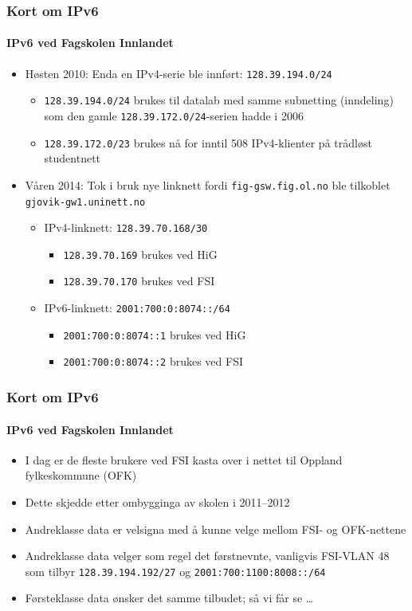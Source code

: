 \begin{frame}%
  \frametitle{Kort om IPv6}
  \framesubtitle{IPv6 ved Fagskolen Innlandet}
  \begin{itemize}[<+->]
  \item Høsten 2010: Enda en IPv4-serie ble innført:
    \texttt{128.39.194.0/24}
    \begin{itemize}[<+->]
    \item \texttt{128.39.194.0/24} brukes til datalab med samme
      subnetting (inndeling) som den gamle
      \texttt{128.39.172.0/24}-serien hadde i 2006
    \item \texttt{128.39.172.0/\alert{23}} brukes nå for inntil 508
      IPv4-klienter på trådløst studentnett
    \end{itemize}
  \item Våren 2014: Tok i bruk nye linknett fordi
    \texttt{fig-gsw.fig.ol.no} ble tilkoblet
    \texttt{gjovik-gw1.uninett.no}
    \begin{itemize}[<+->]
    \item IPv4-linknett: \texttt{128.39.70.168/30}
      \begin{itemize}[<+->]
      \item \texttt{128.39.70.169} brukes ved HiG
      \item \texttt{128.39.70.170} brukes ved FSI
      \end{itemize}
    \item IPv6-linknett: \texttt{2001:700:0:8074::/64}
      \begin{itemize}[<+->]
      \item \texttt{2001:700:0:8074::1} brukes ved HiG
      \item \texttt{2001:700:0:8074::2} brukes ved FSI
      \end{itemize}
    \end{itemize}
  \end{itemize}
\end{frame}

\begin{frame}%
  \frametitle{Kort om IPv6}
  \framesubtitle{IPv6 ved Fagskolen Innlandet}
  \begin{itemize}[<+->]
  \item I dag er de fleste brukere ved FSI kasta over i nettet til
    Oppland fylkeskommune (OFK)
  \item Dette skjedde etter ombygginga av skolen i 2011--2012
  \item Andreklasse data er velsigna med å kunne velge mellom FSI- og
    OFK-nettene
  \item Andreklasse data velger som regel det førstnevnte, vanligvis
    FSI-VLAN 48 som tilbyr \texttt{128.39.194.192/27} og
    \texttt{2001:700:1100:8008::/64}
  \item Førsteklasse data ønsker det samme tilbudet; så vi får se \dots
  \end{itemize}
\end{frame}

